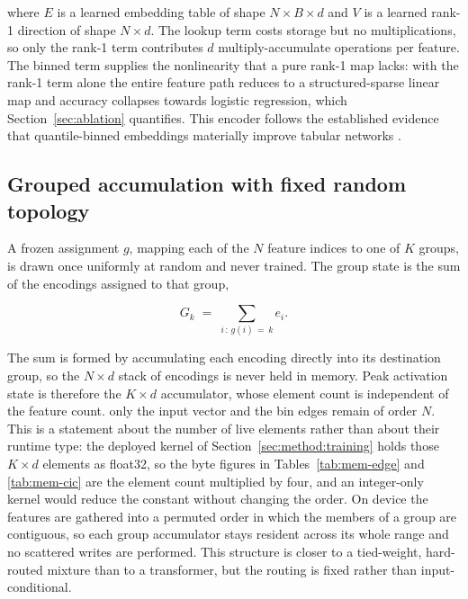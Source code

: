 \documentclass[10pt,letterpaper,twocolumn]{article}
\begin{document}
where $E$ is a learned embedding table of shape $N \times B \times d$ and $V$
is a learned rank-1 direction of shape $N \times d$. The lookup term costs
storage but no multiplications, so only the rank-1 term contributes $d$
multiply-accumulate operations per feature. The binned term supplies the
nonlinearity that a pure rank-1 map lacks: with the rank-1 term alone the
entire feature path reduces to a structured-sparse linear map and accuracy
collapses towards logistic regression, which Section~\ref{sec:ablation}
quantifies. This encoder follows the established
evidence that quantile-binned embeddings materially improve tabular networks
\cite{gorishniy2022embeddings}.

\subsection{Grouped accumulation with fixed random topology}
\label{sec:method:grouping}

A frozen assignment $g$, mapping each of the $N$ feature indices to one of $K$
groups, is drawn once uniformly at random and never trained. The group state is
the sum of the encodings assigned to that group,

\begin{equation}
\label{eq:group}
G_{k} \;=\; \sum_{i \,:\, g(i)\,=\,k} e_{i}.
\end{equation}

The sum is formed by accumulating each encoding directly into its destination
group, so the $N \times d$ stack of encodings is never held in memory. Peak
activation state is therefore the $K \times d$ accumulator, whose element count
is independent of the feature count. only the input vector and the bin edges
remain of order $N$. This is a statement about the number of live elements
rather than about their runtime type: the deployed kernel of
Section~\ref{sec:method:training} holds those $K \times d$ elements as float32,
so the byte figures in Tables~\ref{tab:mem-edge} and \ref{tab:mem-cic} are the
element count multiplied by four, and an integer-only kernel would reduce the
constant without changing the order. On device the features are gathered into a
permuted order in which the members of a group are contiguous, so each group
accumulator stays resident across its whole range and no scattered writes are
performed. This structure is closer to a tied-weight, hard-routed mixture
\cite{shazeer2017moe} than to a transformer, but the routing is fixed rather
than input-conditional.
\end{document}
